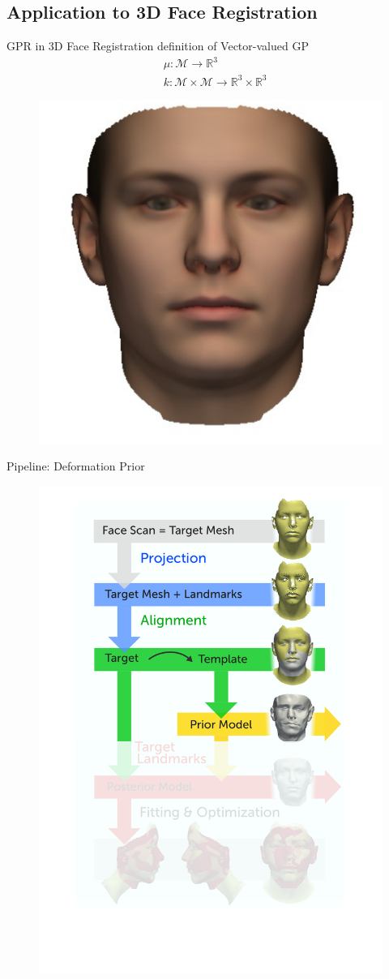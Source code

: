 \documentclass[xcolor=x11names,compress]{beamer}
\begin{document}
\subsection{Application to 3D Face Registration}
\begin{frame}{GPR in 3D Face Registration}
definition of Vector-valued GP
\begin{align*}
    & \mu: \mathcal{M} \rightarrow \mathbb{R}^3\\
    & k: \mathcal{M} \times \mathcal{M} \rightarrow \mathbb{R}^3 \times \mathbb{R}^3
\end{align*}
 \begin{figure}
        \centering
        \includegraphics[width=.5\textwidth]{../resources/img/mean_msh.pdf}
    \end{figure}
\end{frame}

\begin{frame}{Pipeline: Deformation Prior}
\begin{figure}   
\centering
\includegraphics[width=.6\textwidth]{../resources/figures/pipeline_prior.pdf}
\end{figure}
\end{frame}
\end{document}
